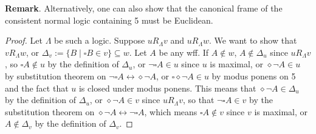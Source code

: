\documentclass[12pt]{article}
\begin{document}
\textbf{Remark}.  Alternatively, one can also show that the canonical frame of the consistent normal logic containing 5 must be Euclidean.
\begin{proof}  Let $\Lambda$ be such a logic.  Suppose $u R_{\Lambda} v$ and $u R_{\Lambda} w$.  We want to show that $v R_{\Lambda} w$, or $\Delta_v:=\lbrace B\mid \square B\in v\rbrace \subseteq w$.  Let $A$ be any wff.  If $A\notin w$, $A\notin \Delta_u$ since $u R_{\Lambda} v$, so $\square A \notin u$ by the definition of $\Delta_u$, or $\neg \square A\in u$ since $u$ is maximal, or $\diamond \neg A \in u$ by substitution theorem on $\neg \square A \leftrightarrow \diamond \neg A$, or $\square \diamond \neg A \in u$ by modus ponens on 5 and the fact that $u$ is closed under modus ponens.  This means that $\diamond \neg A \in \Delta_u$ by the definition of $\Delta_u$, or $\diamond \neg A \in v$ since $u R_{\Lambda} v$, so that $\neg \square A \in v$ by the substitution theorem on $\diamond \neg A\leftrightarrow \neg \square A$, which means $\square A\notin v$ since $v$ is maximal, or $A\notin \Delta_v$ by the definition of $\Delta_v$.
\end{proof}

\end{document}
